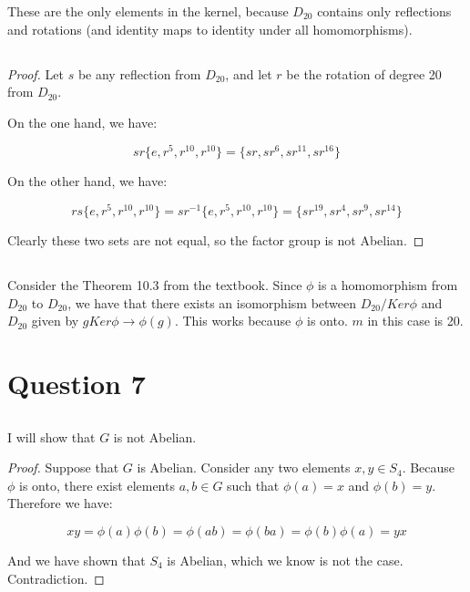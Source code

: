 \documentclass[a4paper,12pt]{article}
\numberwithin{equation}{section}
\begin{document}
These are the only elements in the kernel, because $D_{20}$ contains only reflections and rotations (and identity maps to identity under all homomorphisms).

\subsection{}

\begin{proof}
Let $s$ be any reflection from $D_{20}$, and let $r$ be the rotation of degree 20 from $D_{20}$. 

On the one hand, we have:

\begin{equation}
sr\{e, r^5, r^{10}, r^{10} \} = \{ sr, sr^6, sr^{11}, sr^{16} \}
\end{equation}

On the other hand, we have:

\begin{equation}
rs \{e, r^5, r^{10}, r^{10} \} = sr^{-1} \{e, r^5, r^{10}, r^{10} \} =  \{ sr^{19}, sr^4, sr^{9}, sr^{14} \}
\end{equation}

Clearly these two sets are not equal, so the factor group is not Abelian.
\end{proof}

\subsection{}
Consider the Theorem 10.3 from the textbook. Since $\phi$ is a homomorphism from $D_{20}$ to $D_{20}$, we have that there exists an isomorphism between $D_{20} / Ker \phi$ and $D_{20}$ given by $gKer\phi \rightarrow \phi(g)$. This works because $\phi$ is onto. $m$ in this case is 20.

\section{Question 7}

\subsection{}
 
I will show that $G$ is not Abelian.

\begin{proof}
Suppose that $G$ is Abelian. Consider any two elements $x, y \in S_4$. Because $\phi$ is onto, there exist elements $a, b \in G$ such that $\phi(a) = x$ and $\phi(b) = y$. Therefore we have:

\begin{equation}
xy = \phi(a)\phi(b) = \phi(ab) = \phi(ba) = \phi(b)\phi(a) = yx
\end{equation}

And we have shown that $S_4$ is Abelian, which we know is not the case. Contradiction.
\end{proof}
\end{document}
